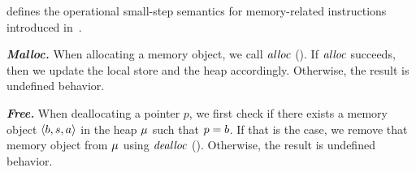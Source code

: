  defines the operational small-step semantics for memory-related instructions introduced in~.

%

\textbf{\textit{Malloc.}}
When allocating a memory object,
we call $\mathit{alloc}$ ().
If $\mathit{alloc}$ succeeds, then we update the local store and the heap accordingly.
Otherwise, the result is undefined behavior.


\textbf{\textit{Free.}}
When deallocating a pointer $p$,
we first check if there exists a memory object $\langle{b},{s},{a}\rangle$ in the heap $\mathit{\mu}$ such that $p = b$.
If that is the case, we remove that memory object from $\mathit{\mu}$ using $\mathit{dealloc}$ ().
Otherwise, the result is undefined behavior.

